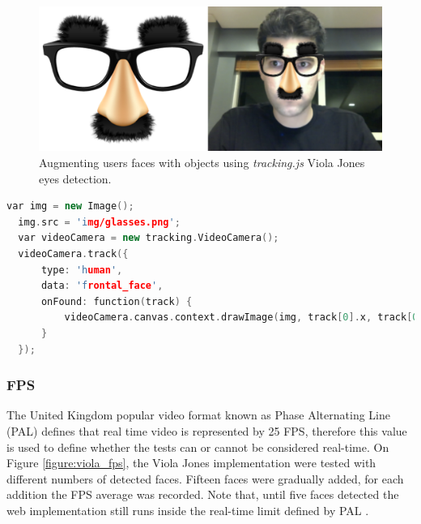 \begin{figure}[!htb]
  \centering
  \includegraphics[width=380pt]{chapters/evaluation/viola_glass_face.png}
  \caption{Augmenting users faces with objects using \textit{tracking.js} Viola Jones eyes detection.}
  \label{figure:viola_glass_face}
\end{figure}

\begin{lstlisting}[language=C++,label={lst:viola},caption=Example of \textit{tracking.js} API of augmenting users faces with objects using Viola Jones eyes detection.]
  var img = new Image();
  img.src = 'img/glasses.png';
  var videoCamera = new tracking.VideoCamera();
  videoCamera.track({
      type: 'human',
      data: 'frontal_face',
      onFound: function(track) {
          videoCamera.canvas.context.drawImage(img, track[0].x, track[0].y, track[0].size, track[0].size);
      }
  });
\end{lstlisting}


\subsubsection{FPS} %
\label{subsub:evaluation:results:rapid_object_detection:fps}

The United Kingdom popular video format known as Phase Alternating Line (PAL) \cite{PAL1962} defines that real time video is represented by 25 FPS, therefore this value is used to define whether the tests can or cannot be considered real-time. On Figure \ref{figure:viola_fps}, the Viola Jones implementation were tested with different numbers of detected faces. Fifteen faces were gradually added, for each addition the FPS average was recorded. Note that, until five faces detected the web implementation still runs inside the real-time limit defined by PAL \cite{PAL1962}.

